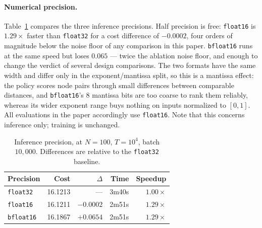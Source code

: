 \documentclass[letterpaper]{article} %
\begin{document}
\paragraph{Numerical precision.}
Table~\ref{tab:precision} compares the three inference precisions. Half precision is free: \texttt{float16} is $1.29\times$ faster than \texttt{float32} for a cost difference of $-0.0002$, four orders of magnitude below the noise floor of any comparison in this paper. \texttt{bfloat16} runs at the same speed but loses $0.065$ --- twice the ablation noise floor, and enough to change the verdict of several design comparisons. The two formats have the same width and differ only in the exponent/mantissa split, so this is a mantissa effect: the policy scores node pairs through small differences between comparable distances, and \texttt{bfloat16}'s $8$ mantissa bits are too coarse to rank them reliably, whereas its wider exponent range buys nothing on inputs normalized to $[0, 1]$. All evaluations in the paper accordingly use \texttt{float16}. Note that this concerns inference only; training is unchanged.

\begin{table}[t]
\centering
\small
\setlength{\tabcolsep}{8pt}
\begin{tabular}{@{}l r r r r@{}}
\toprule
Precision & Cost & $\Delta$ & Time & Speedup \\
\midrule
\texttt{float32}  & 16.1213 & ---       & 3m40s & $1.00\times$ \\
\texttt{float16}  & 16.1211 & $-0.0002$ & 2m51s & $1.29\times$ \\
\texttt{bfloat16} & 16.1867 & $+0.0654$ & 2m51s & $1.29\times$ \\
\bottomrule
\end{tabular}
\caption{Inference precision, at $N = 100$, $T = 10^{4}$, batch $10{,}000$. Differences are relative to the \texttt{float32} baseline.}
\label{tab:precision}
\end{table}
\end{document}
